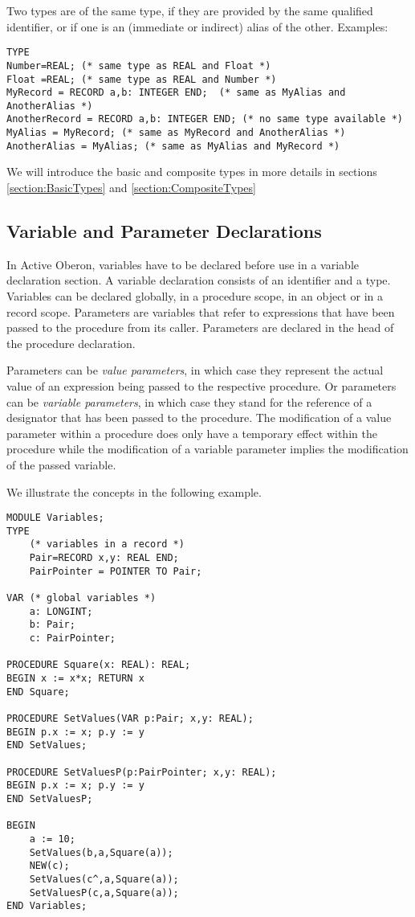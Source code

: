 \documentclass[a4paper,11pt]{article}
\begin{document}
Two types are of the same type, if they are provided by the same qualified identifier, or if one is an (immediate or indirect) alias of the other. Examples:
\begin{lstlisting}[language=Oberon,frame=none,caption={Same and different types}]
TYPE
Number=REAL; (* same type as REAL and Float *)
Float =REAL; (* same type as REAL and Number *)
MyRecord = RECORD a,b: INTEGER END;  (* same as MyAlias and AnotherAlias *)
AnotherRecord = RECORD a,b: INTEGER END; (* no same type available *)
MyAlias = MyRecord; (* same as MyRecord and AnotherAlias *)
AnotherAlias = MyAlias; (* same as MyAlias and MyRecord *)
\end{lstlisting}

We will introduce the basic and composite types in more details in sections \ref{section:BasicTypes} and \ref{section:CompositeTypes}

\subsection{Variable and Parameter Declarations}
In Active Oberon, variables have to be declared before use in a variable declaration section. A variable declaration consists of an identifier and a type. Variables can be declared globally, in a procedure scope, in an object or in a record scope. Parameters are variables that refer to expressions that have been passed to the procedure from its caller. Parameters are declared in the head of the procedure declaration.
 
Parameters can be {\em value parameters}, in which case they represent the actual value of an expression being passed to the respective procedure. Or parameters can be {\em variable parameters}, in which case they stand for the reference of a designator that has been passed to the procedure. The modification of a value parameter within a procedure does only have a temporary effect within the procedure while the modification of a variable parameter implies the modification of the passed variable.

We illustrate the concepts in the following example. 

\begin{lstlisting}[language=Oberon,frame=none,caption={Variables and Parameters}]
MODULE Variables; 
TYPE
    (* variables in a record *) 
    Pair=RECORD x,y: REAL END; 
    PairPointer = POINTER TO Pair; 
    
VAR (* global variables *) 
    a: LONGINT; 
    b: Pair;
    c: PairPointer; 

PROCEDURE Square(x: REAL): REAL;
BEGIN x := x*x; RETURN x
END Square; 

PROCEDURE SetValues(VAR p:Pair; x,y: REAL);  
BEGIN p.x := x; p.y := y
END SetValues;

PROCEDURE SetValuesP(p:PairPointer; x,y: REAL);
BEGIN p.x := x; p.y := y
END SetValuesP;

BEGIN 
    a := 10; 
    SetValues(b,a,Square(a)); 
    NEW(c); 
    SetValues(c^,a,Square(a));
    SetValuesP(c,a,Square(a)); 
END Variables; 
\end{lstlisting}
\end{document}
